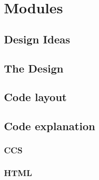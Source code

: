 \newpage
\chapter{Modules}
\section{Design Ideas}
\section{The Design}

\section{Code layout}

\section{Code explanation}

\subsection{CCS}

\subsection{HTML}